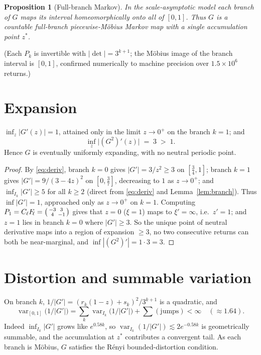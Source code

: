 \documentclass[11pt]{article}
\newtheorem{proposition}{Proposition}\newtheorem{corollary}{Corollary}
\theoremstyle{definition}\newtheorem{definition}{Definition}
\theoremstyle{remark}\newtheorem{remark}{Remark}
\newcommand{\Flin}{F_{\!\ell}}\newcommand{\Clin}{C_{\ell}}
\begin{document}
\begin{proposition}[Full-branch Markov]\label{prop:markov}
In the scale-asymptotic model each branch of $G$ maps its interval
homeomorphically onto all of $[0,1]$. Thus $G$ is a countable full-branch
piecewise-M\"obius Markov map with a single accumulation point $z^\ast$.
\end{proposition}
\noindent(Each $P_k$ is invertible with $|\det|=3^{k+1}$; the M\"obius image
of the branch interval is $[0,1]$, confirmed numerically to machine
precision over $1.5\times10^6$ returns.)

\section{Expansion}
\begin{lemma}\label{lem:exp}
$\inf_z|G'(z)|=1$, attained only in the limit $z\to0^+$ on the branch
$k=1$; and
\[
\inf_z\bigl|(G^2)'(z)\bigr| \;=\; 3 \;>\;1 .
\]
Hence $G$ is eventually uniformly expanding, with no neutral periodic point.
\end{lemma}
\begin{proof}
By \eqref{eq:deriv}, branch $k=0$ gives $|G'|=3/z^2\ge3$ on $[\tfrac34,1]$;
branch $k=1$ gives $|G'|=9/(3-4z)^2$ on $[0,\tfrac{3}{7}]$, decreasing to
$1$ as $z\to0^+$; and $\inf_{I_k}|G'|\ge 5$ for all $k\ge2$ (direct from
\eqref{eq:deriv} and Lemma~\ref{lem:branch}). Thus $\inf|G'|=1$, approached
only as $z\to0^+$ on $k=1$. Computing $P_1=\Clin\Flin=\begin{psmallmatrix}-3&3\\4&-1\end{psmallmatrix}$
gives that $z=0$ ($\xi=1$) maps to $\xi'=\infty$, i.e.\ $z'=1$; and $z=1$
lies in branch $k=0$ where $|G'|\ge3$. So the unique point of neutral
derivative maps into a region of expansion $\ge3$, no two consecutive
returns can both be near-marginal, and $\inf|(G^2)'|=1\cdot3=3$.
\end{proof}

\section{Distortion and summable variation}
\begin{lemma}\label{lem:var}
On branch $k$, $1/|G'|=(r_k(1-z)+s_k)^2/3^{k+1}$ is a quadratic, and
\[
\operatorname{var}_{[0,1]}\!\bigl(1/|G'|\bigr)
=\sum_k \operatorname{var}_{I_k}\!\bigl(1/|G'|\bigr)+\textstyle\sum(\text{jumps})
<\infty \quad(\approx 1.64).
\]
Indeed $\inf_{I_k}|G'|$ grows like $e^{0.58k}$, so
$\operatorname{var}_{I_k}(1/|G'|)\lesssim 2e^{-0.58k}$ is geometrically
summable, and the accumulation at $z^\ast$ contributes a convergent tail.
As each branch is M\"obius, $G$ satisfies the R\'enyi bounded-distortion
condition.
\end{lemma}
\end{document}
